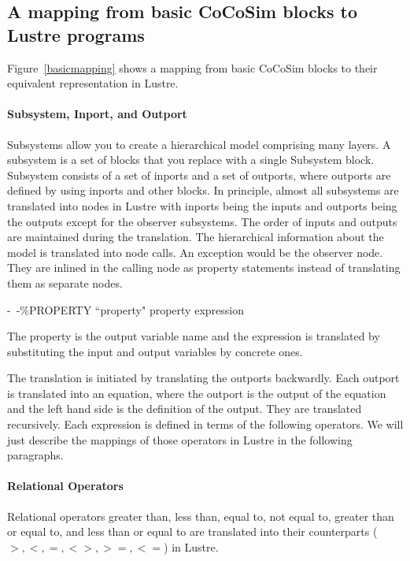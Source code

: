\documentclass{article}
\begin{document}
\subsection{A mapping from basic CoCoSim blocks to Lustre programs}
Figure~\ref{basicmapping} shows a mapping from basic CoCoSim blocks to their equivalent representation in Lustre.

\paragraph{Subsystem, Inport, and Outport} 
Subsystems allow you to create a hierarchical model comprising many layers. 
A subsystem is a set of blocks that you replace with a single Subsystem block. 
Subsystem consists of a set of inports and a set of outports, where outports are
defined by using inports and other blocks. 
In principle, almost all subsystems are translated into nodes in Lustre with inports being the 
inputs and outports being the outputs except for the observer subsystems. 
The order of inputs and outputs are maintained during the translation. 
The hierarchical information about the model is translated into node calls.
An exception would be the observer node.
They are inlined in the calling node as property statements instead of translating them 
as separate nodes.

\*

\indent \indent \indent \indent \textsf{-\ -\%PROPERTY ``property" property expression}

\*


\noindent The property is the output variable name and the expression is translated 
by substituting the input and output variables by concrete ones.

The translation is initiated by translating the outports backwardly. 
Each outport is translated into an equation, where the outport is the output of the equation 
and the left hand side is the definition of the output.
They are translated recursively.
Each expression is defined in terms of the following operators. 
We will just describe the mappings of those operators in Lustre in the following paragraphs.

\paragraph{Relational Operators} 
Relational operators greater than, less than, equal to, not equal to, greater 
than or equal to, and less than or equal to are translated into their counterparts 
($>, <, =, <>, >=, <=$) in Lustre.
\end{document}
